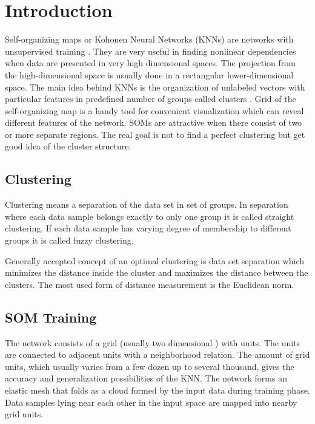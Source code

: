 \documentclass[runningheads]{llncs}
\begin{document}
\section{Introduction}

Self-organizing maps or Kohonen Neural Networks (KNNs) are networks with unsupervised training \cite{schreck01}. They are very useful in finding nonlinear dependencies when data are presented in very high dimensional spaces. The projection from the high-dimensional space is usually done in a rectangular lower-dimensional space. The main idea behind KNNs is the organization of unlabeled vectors with particular features in predefined number of groups called clusters \cite{cottrell01}. Grid of the self-organizing map is a handy tool for convenient visualization which can reveal different features of the network. SOMs are attractive when there consist of two or more separate regions. The real goal is not to find a perfect clustering but get good idea of the cluster structure. 

\subsection{Clustering}

Clustering means a separation of the data set in set of groups. In separation where each data sample belongs exactly to only one group it is called straight clustering. If each data sample has varying degree of membership to different groups it is called fuzzy clustering.

Generally accepted concept of an optimal clustering is data set separation which minimizes the distance inside the cluster and maximizes the distance between the clusters. The most used form of distance measurement is the Euclidean norm. 

\subsection{SOM Training}

The network consists of a grid (usually two dimensional \cite{wehrens01}) with units. The units are connected to adjacent units with a neighborhood relation. The amount of grid units, which usually varies from a few dozen up to several thousand, gives the accuracy and generalization possibilities of the KNN. The network forms an elastic mesh that folds
as a cloud formed by the input data during training phase. Data samples lying near each other in the input space are mapped into nearby grid units. 
\end{document}
